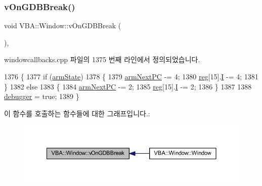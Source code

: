 \subsubsection{\texorpdfstring{v\+On\+G\+D\+B\+Break()}{vOnGDBBreak()}}
{\footnotesize\ttfamily void V\+B\+A\+::\+Window\+::v\+On\+G\+D\+B\+Break (\begin{DoxyParamCaption}{ }\end{DoxyParamCaption})\hspace{0.3cm}{\ttfamily [protected]}, {\ttfamily [virtual]}}



windowcallbacks.\+cpp 파일의 1375 번째 라인에서 정의되었습니다.


\begin{DoxyCode}
1376 \{
1377   \textcolor{keywordflow}{if} (\mbox{\hyperlink{_g_b_a_8h_adeb5542a7f7ef80090a22d0133606250}{armState}})
1378   \{
1379     \mbox{\hyperlink{arm-new_8h_a7e8bf67a6667274a53fc092b97961ca4}{armNextPC}} -= 4;
1380     \mbox{\hyperlink{_g_b_a_8h_ae29faba89509024ffd1a292badcedf2d}{reg}}[15].\mbox{\hyperlink{unionreg__pair_a9f6a42d56c07829d7013571eda998252}{I}} -= 4;
1381   \}
1382   \textcolor{keywordflow}{else}
1383   \{
1384     \mbox{\hyperlink{arm-new_8h_a7e8bf67a6667274a53fc092b97961ca4}{armNextPC}} -= 2;
1385     \mbox{\hyperlink{_g_b_a_8h_ae29faba89509024ffd1a292badcedf2d}{reg}}[15].\mbox{\hyperlink{unionreg__pair_a9f6a42d56c07829d7013571eda998252}{I}} -= 2;
1386   \}
1387 
1388   \mbox{\hyperlink{windowcallbacks_8cpp_af67e2df4c66ef114f4edb85c06810007}{debugger}} = \textcolor{keyword}{true};
1389 \}
\end{DoxyCode}
이 함수를 호출하는 함수들에 대한 그래프입니다.\+:
\nopagebreak
\begin{figure}[H]
\begin{center}
\leavevmode
\includegraphics[width=350pt]{class_v_b_a_1_1_window_add1f8eb55cc9523cfdb6dbc3b9fbf4cf_icgraph}
\end{center}
\end{figure}
\mbox{\label{class_v_b_a_1_1_window_ad6f454f394ed7265f374e78b2a255cbb}} 
